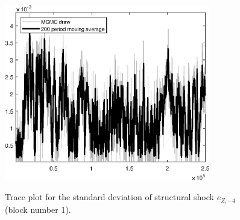 \begin{figure}[H]
\centering
  \includegraphics[width=0.8\textwidth]{BRS_aggregate/graphs/TracePlot_SE_e_Z_news_blck_1}\\
    \caption{Trace plot for the standard deviation of structural shock ${e_{Z,-4}}$ (block number 1).}
\end{figure}
